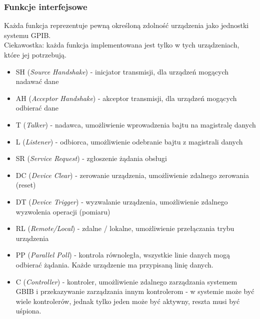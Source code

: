 \subsubsection{Funkcje interfejsowe}
Każda funkcja reprezentuje pewną określoną zdolność urządzenia jako jednostki systemu GPIB.\\
Ciekawostka: każda funkcja implementowana jest tylko w tych urządzeniach, które jej potrzebują.
\begin{itemize}
	\item SH (\emph{Source Handshake}) - inicjator transmisji, dla urządzeń mogących nadawać dane
	\item AH (\emph{Acceptor Handshake}) - akceptor transmisji, dla urządzeń mogących odbierać dane
	\item T (\emph{Talker}) - nadawca, umożliwienie wprowadzenia bajtu na magistralę danych
	\item L (\emph{Listener}) - odbiorca, umożliwienie odebranie bajtu z magistrali danych
	\item SR (\emph{Service Request}) - zgłoszenie żądania obsługi
	\item DC (\emph{Device Clear}) - zerowanie urządzenia, umożliwienie zdalnego zerowania (reset)
	\item DT (\emph{Device Trigger}) - wyzwalanie urządzenia, umożliwienie zdalnego wyzwolenia operacji (pomiaru)
	\item RL (\emph{Remote/Local}) - zdalne / lokalne, umożliwienie przełączania trybu urządzenia
	\item PP (\emph{Parallel Poll}) - kontrola równoległa, wszystkie linie danych mogą odbierać żądania. Każde urządzenie ma przypisaną linię danych. 
	\item C (\emph{Controller}) - kontroler, umożliwienie zdalnego zarządzania systemem GBIB i przekazywanie zarządzania innym kontrolerom - w systemie może być wiele kontrolerów, jednak tylko jeden może być aktywny, reszta musi być uśpiona.
\end{itemize}

